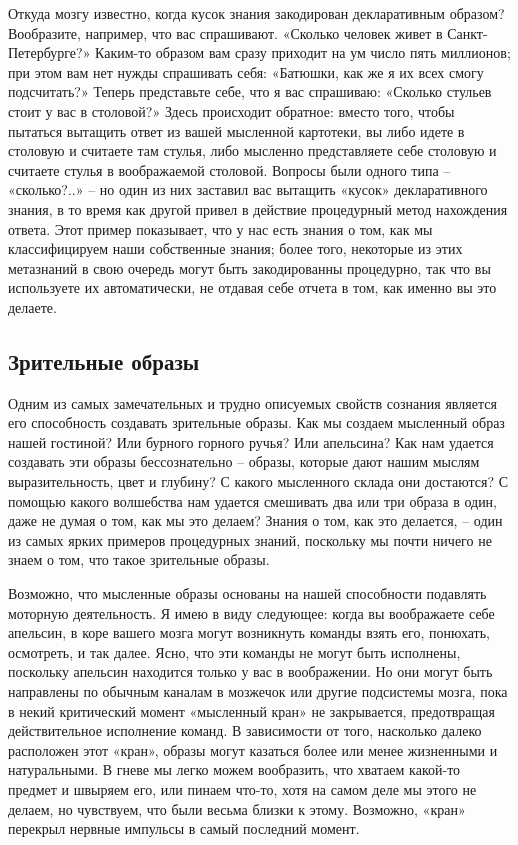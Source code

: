 \documentclass[../main.tex]{subfiles}
\begin{document}
Откуда мозгу известно, когда кусок знания закодирован декларативным образом? Вообразите, например, что вас спрашивают. «Сколько человек живет в Санкт-Петербурге?» Каким-то образом вам сразу приходит на ум число пять миллионов; при этом вам нет нужды спрашивать себя: «Батюшки, как же я их всех смогу подсчитать?» Теперь представьте себе, что я вас спрашиваю: «Сколько стульев стоит у вас в столовой?» Здесь происходит обратное: вместо того, чтобы пытаться вытащить ответ из вашей мысленной картотеки, вы либо идете в столовую и считаете там стулья, либо мысленно представляете себе столовую и считаете стулья в воображаемой столовой. Вопросы были одного типа \--- «сколько?..» \--- но один из них заставил вас вытащить «кусок» декларативного знания, в то время как другой привел в действие процедурный метод нахождения ответа. Этот пример показывает, что у нас есть знания о том, как мы классифицируем наши собственные знания; более того, некоторые из этих метазнаний в свою очередь могут быть закодированны процедурно, так что вы используете их автоматически, не отдавая себе отчета в том, как именно вы это делаете.


\subsection{Зрительные образы}

Одним из самых замечательных и трудно описуемых свойств сознания является его способность создавать зрительные образы. Как мы создаем мысленный образ нашей гостиной? Или бурного горного ручья? Или апельсина? Как нам удается создавать эти образы бессознательно \--- образы, которые дают нашим мыслям выразительность, цвет и глубину? С какого мысленного склада они достаются? С помощью какого волшебства нам удается смешивать два или три образа в один, даже не думая о том, как мы это делаем? Знания о том, как это делается, \--- один из самых ярких примеров процедурных знаний, поскольку мы почти ничего не знаем о том, что такое зрительные образы.

Возможно, что мысленные образы основаны на нашей способности подавлять моторную деятельность. Я имею в виду следующее: когда вы воображаете себе апельсин, в коре вашего мозга могут возникнуть команды взять его, понюхать, осмотреть, и так далее. Ясно, что эти команды не могут быть исполнены, поскольку апельсин находится только у вас в воображении. Но они могут быть направлены по обычным каналам в мозжечок или другие подсистемы мозга, пока в некий критический момент «мысленный кран» не закрывается, предотвращая действительное исполнение команд. В зависимости от того, насколько далеко расположен этот «кран», образы могут казаться более или менее жизненными и натуральными. В гневе мы легко можем вообразить, что хватаем какой-то предмет и швыряем его, или пинаем что-то, хотя на самом деле мы этого не делаем, но чувствуем, что были весьма близки к этому. Возможно, «кран» перекрыл нервные импульсы в самый последний момент.
\end{document}
